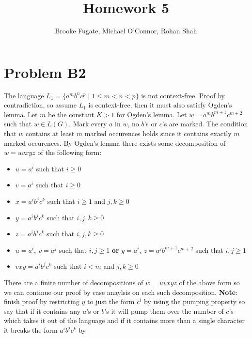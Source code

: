 \documentclass[12pt]{article}
\begin{document}
\pagestyle{plain}
\titleformat{\subsection}[runin]
  {\normalfont\large\bfseries}{\thesubsection}{1em}{}

\title{Homework 5}
\author{Brooke Fugate, Michael O'Connor, Rohan Shah}
\date{}

\maketitle

\section*{Problem B2}
The language $L_1 = \{a^mb^nc^p \mid 1\le m<n<p\}$ is not context-free. Proof by
contradiction, so assume $L_1$ is context-free, then it must also satisfy
Ogden's lemma. Let $m$ be the constant $K > 1$ for Ogden's lemma. Let
$w = a^mb^{m+1}c^{m+2}$ such that $w \in L(G)$. Mark every $a$ in $w$,
no $b$'s or $c$'s are marked. The condition that $w$ contains at least $m$
marked occurences holds since it contains exactly $m$ marked occurences.
By Ogden's lemma there exists some decomposition of $w = uvxyz$ of the
following form:
\begin{itemize}
\item $u=a^i$ such that $i\ge 0$
\item $v=a^i$ such that $i\ge 0$
\item $x=a^ib^jc^k$ such that $i\ge 1$ and $j,k\ge 0$
\item $y=a^ib^jc^k$ such that $i,j,k\ge 0$
\item $z=a^ib^jc^k$ such that $i,j,k\ge 0$
\item $u=a^i,\ v=a^j$ such that $i,j\ge 1$ \textbf{or}
$y=a^i,\ z=a^jb^{m+1}c^{m+2}$ such that $i,j\ge 1$
\item $vxy = a^ib^jc^k$ such that $i<m$ and $j,k\ge 0$
\end{itemize}
There are a finite number of decompositions of $w=uvxyz$ of the above form so we
can continue our proof by case anaylsis on each such decomposition.
\vspace{3mm}
\newline
\textbf{Note}: finish proof by restricting $y$ to just the form $c^i$ by using
the pumping property so say that if it contains any $a$'s or $b$'s it will
pump them over the number of $c$'s which takes it out of the language and if
it contains more than a single character it breaks the form $a^ib^jc^k$ by
\end{document}
